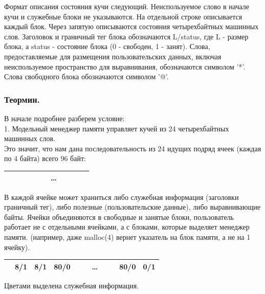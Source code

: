 \documentclass[12pt, letterpaper]{article}
\begin{document}
Формат описания состояния кучи следующий. Неиспользуемое слово в начале кучи и служебные блоки не указываются. На отдельной строке описывается каждый блок. Через запятую описываются состояния четырехбайтных машинных слов. Заголовок и граничный тег блока обозначаются L/status, где L - размер блока, а status - состояние блока (0 - свободен, 1 - занят). Слова, предоставляемые для размещения пользовательских данных, включая неиспользуемое пространство для выравнивания, обозначаются символом '*'. Слова свободного блока обозначаются символом '@'.
\newpage
\subsubsection{Теормин.}
В начале подробнее разберем условие:\\
1. Модельный менеджер памяти управляет кучей из 24 четырехбайтных машинных слов.\\
Это значит, что нам дана последовательность из 24 идущих подряд ячеек (каждая по 4 байта) всего 96 байт:\\
\begin{center}
    \begin{tabular}{|c|c|c|c|c|c|c|c|c|c|c|}
        \hline
          & & & & & & \dots & & & & \\
        \hline
    \end{tabular}
\end{center}
В каждой ячейке может храниться либо служебная информация (заголовки граничный тег), либо полезные (пользовательские данные), либо выравнивающие байты. Ячейки объединяются в свободные и занятые блоки, пользователь работает не с отдельными ячейками, а с блоками, которые выделяет менеджер памяти. (например, даже malloc(4) вернет указатель на блок памяти, а не на 1 ячейку).
\begin{center}
    \begin{tabular}{|c|c|c|c|c|c|c|c|c|c|c|}
        \hline
         \cellcolor{black} & \cellcolor{blue!=40} 8/1 & \cellcolor{green!=40} 8/1 & \cellcolor{blue!=40} 80/0 & & & \dots & & & \cellcolor{green!=40} 80/0 & \cellcolor{red!=40}0/1 \\
        \hline
    \end{tabular}
\end{center}
Цветами выделена служебная информация. 
\newline
\end{document}
